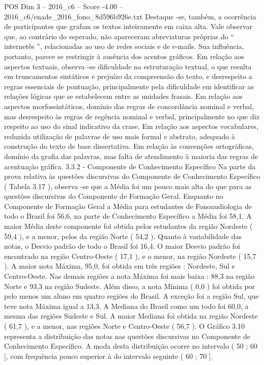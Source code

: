 \begin{textsample}{POS Dim 3 – 2016\_c6 – Score -4.00 – 2016\_c6/enade\_2016\_fono\_8d596b926e.txt}
Destaque -se, também, a ocorrência de participantes que grafam os textos inteiramente em caixa alta.
Vale observar que, ao contrário do esperado, não apareceram abreviaturas próprias do “ internetês ”, relacionadas ao uso de redes sociais e de e-mails.
Sua influência, portanto, parece se restringir à ausência dos acentos gráficos.
Em relação aos aspectos textuais, observa -se dificuldade na estruturação textual, o que resulta em truncamentos sintáticos e prejuízo da compreensão do texto, e desrespeito a regras essenciais de pontuação, principalmente pela dificuldade em identificar as relações lógicas que se estabelecem entre as unidades frasais.
Em relação aos aspectos morfossintáticos, domínio das regras de concordância nominal e verbal, mas desrespeito às regras de regência nominal e verbal, principalmente no que diz respeito ao uso do sinal indicativo da crase.
Em relação aos aspectos vocabulares, reduzida utilização de palavras de uso mais formal e abstrato, adequado à construção do texto de base dissertativa.
Em relação às convenções ortográficas, domínio da grafia das palavras, mas falta de atendimento à maioria das regras de acentuação gráfica. 3.3.2 - Componente de Conhecimento Específico Na parte da prova relativa às questões discursivas do Componente de Conhecimento Específico ( Tabela 3.17 ), observa -se que a Média foi um pouco mais alta do que para as questões discursivas do Componente de Formação Geral.
Enquanto no Componente de Formação Geral a Média para estudantes de Fonoaudiologia de todo o Brasil foi 56,6, na parte de Conhecimento Específico a Média foi 58,1.
A maior Média deste componente foi obtida pelos estudantes da região Nordeste ( 59,4 ), e a menor, pelos da região Norte ( 54,2 ).
Quanto à variabilidade das notas, o Desvio padrão de todo o Brasil foi 16,4.
O maior Desvio padrão foi encontrado na região Centro-Oeste ( 17,1 ), e o menor, na região Nordeste ( 15,7 ).
A maior nota Máxima, 95,0, foi obtida em três regiões : Nordeste, Sul e Centro-Oeste.
Nas demais regiões a nota Máxima foi mais baixa : 88,3 na região Norte e 93,3 na região Sudeste.
Além disso, a nota Mínima ( 0,0 ) foi obtida por pelo menos um aluno em quatro regiões do Brasil.
A exceção foi a região Sul, que teve nota Máxima igual a 13,3.
A Mediana do Brasil como um todo foi 60,0, a mesma das regiões Sudeste e Sul.
A maior Mediana foi obtida na região Nordeste ( 61,7 ), e a menor, nas regiões Norte e Centro-Oeste ( 56,7 ).
O Gráfico 3.10 representa a distribuição das notas nas questões discursivas no Componente de Conhecimento Específico.
A moda desta distribuição ocorre no intervalo ( 50 ; 60 ], com frequência pouco superior à do intervalo seguinte ( 60 ; 70 ].

\end{textsample}

